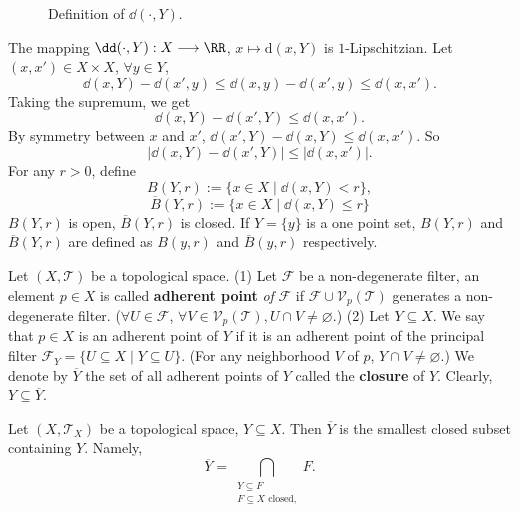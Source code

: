 \begin{exampleenv}
\begin{figure}[H]
\begin{center}
\begin{tikzpicture}[x=0.75pt,y=0.75pt,yscale=-1,xscale=1]
\end{tikzpicture}
    \end{center}
    \caption{Definition of $\dd(\cdot, Y)$.}
\end{figure}
    The mapping $\dd(\cdot,Y): X\longrightarrow \RR$, $x\longmapsto \mathrm{d}(x,Y)$ is $1$-Lipschitzian.
    \newline
    Let $(x,x')\in X\times X$, $\forall y\in Y$,
    $$\dd (x,Y)-\dd(x',y)\le \dd(x,y)-\dd(x',y)\le\dd(x,x').$$
    Taking the supremum, we get 
    $$\dd(x,Y)-\dd(x',Y)\le \dd(x,x').$$
    By symmetry between $x$ and $x'$, $\dd(x',Y)-\dd(x,Y)\le \dd(x,x')$. So 
    $$|\dd(x,Y)-\dd(x',Y)|\le |\dd(x,x')|.$$
    For any $r>0$, define 
    $$B(Y,r):=\{x\in X\mid \dd(x,Y)< r\},$$
    $$\overline{B}(Y,r):=\{x\in X\mid \dd(x,Y)\le r\}$$
    $B(Y,r)$ is open, $\overline{B}(Y,r)$ is closed. If $Y=\{y\}$ is a one point set, $B(Y,r)$ and $\overline{B}(Y,r)$ are defined as $B(y,r)$ and $\overline{B}(y,r)$ respectively.
\end{exampleenv}
\begin{definitionenv}
    Let $(X,\mathscr{T})$ be a topological space. 
    \newline
    (1) Let $\mathcal{F}$ be a non-degenerate filter, an element $p\in X$ is called \textbf{adherent point} \textit{of} $\mathcal{F}$ if $\mathcal{F}\cup\mathcal{V}_p(\mathscr{T})$  generates a non-degenerate filter. ($\forall U\in \mathcal{F}$, $\forall V\in \mathcal{V}_p(\mathscr{T}), U\cap V\neq \varnothing.$) 
    \newline
    (2) Let $Y\subseteq X$. We say that $p\in X$ is an adherent point of $Y$ if it is an adherent point of the principal filter $\mathcal{F}_Y=\{U\subseteq X\mid Y\subseteq U\}$. (For any neighborhood $V$ of $p$, $Y\cap V\neq\varnothing$.) We denote by $\overline{Y} $ the set of all adherent points of $Y$ called the \textbf{closure} of $Y$. Clearly, $Y\subseteq \overline{Y}$.
\end{definitionenv}
\begin{propositionenv}
    Let $(X,\mathscr{T}_X)$ be a topological space, $Y\subseteq X$. Then $\overline{Y}$ is the smallest closed subset containing $Y$. Namely, 
    $$\overline{Y}=\bigcap_{\substack{Y\subseteq F\\F\subseteq X \text{ closed,}}} F.$$
\end{propositionenv}
